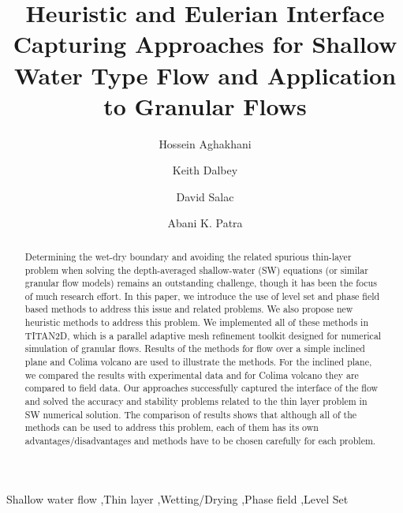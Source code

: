 \documentclass[review]{elsarticle}
\begin{document}
\begin{frontmatter}

\title{Heuristic and Eulerian Interface Capturing Approaches for Shallow Water Type Flow and Application to Granular Flows}


\author[maeaddress]{Hossein Aghakhani}
\author[sandiaaddress]{Keith Dalbey}
\author[maeaddress]{David Salac}
\author[maeaddress]{Abani K. Patra}


\address[maeaddress]{Department of Mechanical and Aerospace Engineering, University at Buffalo, Buffalo, New York, United States}
\address[sandiaaddress]{Sandia National Laboratories, Albuquerque, New Mexico, United States}

\begin{abstract}
Determining the wet-dry boundary and avoiding the related spurious thin-layer problem when 
solving the depth-averaged shallow-water (SW) equations (or similar granular flow models) remains an outstanding challenge, though it  has 
been the focus of much research effort. In this paper, we introduce the use of level set and phase field based methods to address this issue and related problems. We also propose new heuristic 
methods to address this problem. We implemented all of these methods in TITAN2D, which is a parallel adaptive mesh refinement toolkit designed for numerical simulation of granular flows. 
Results of the methods for flow over a simple inclined plane and Colima volcano are used to illustrate the methods. For the inclined plane,
 we compared the results with experimental data and for Colima volcano they are compared to field data. Our approaches successfully captured the interface of the flow and solved the accuracy and stability problems related to the thin layer problem in 
SW numerical solution. The comparison of results shows that although all of the methods can be used to address this problem, 
each of them has its own advantages/disadvantages and methods have to be chosen carefully for each problem. 
\end{abstract}

\begin{keyword}

Shallow water flow \sep Thin layer \sep Wetting/Drying \sep Phase field \sep Level Set

\end{keyword}

\end{frontmatter}
\end{document}
